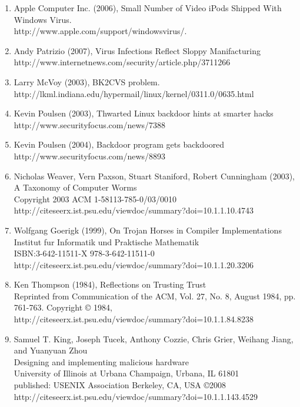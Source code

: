 \documentclass[a4paper, 12pt]{article}
\begin{document}
\begin{enumerate}

\item{Apple Computer Inc. (2006), Small Number of Video iPods Shipped With Windows Virus. \\http://www.apple.com/support/windowsvirus/.}
\item{Andy Patrizio (2007), Virus Infections Reflect Sloppy Manifacturing\\ http://www.internetnews.com/security/article.php/3711266}
\item{Larry McVoy (2003), BK2CVS problem.\\http://lkml.indiana.edu/hypermail/linux/kernel/0311.0/0635.html}
\item{Kevin Poulsen (2003), Thwarted Linux backdoor hints at smarter hacks\\http://www.securityfocus.com/news/7388}
\item{Kevin Poulsen (2004), Backdoor program gets backdoored\\http://www.securityfocus.com/news/8893}
\item{Nicholas Weaver, Vern Paxson, Stuart Staniford, Robert Cunningham (2003), A Taxonomy of Computer Worms\\Copyright 2003 ACM 1-58113-785-0/03/0010\\http://citeseerx.ist.psu.edu/viewdoc/summary?doi=10.1.1.10.4743}
\item{Wolfgang Goerigk (1999), On Trojan Horses in Compiler Implementations\\Institut fur Informatik und Praktische Mathematik\\ISBN:3-642-11511-X 978-3-642-11511-0\\http://citeseerx.ist.psu.edu/viewdoc/summary?doi=10.1.1.20.3206}
\item{Ken Thompson (1984), Reflections on Trusting Trust\\Reprinted from Communication of the ACM, Vol. 27, No. 8, August 1984, pp. 761-763. Copyright © 1984,\\http://citeseerx.ist.psu.edu/viewdoc/summary?doi=10.1.1.84.8238}
\item{Samuel T. King, Joseph Tucek, Anthony Cozzie, Chris Grier, Weihang Jiang, and Yuanyuan Zhou\\Designing and implementing malicious hardware\\University of Illinois at Urbana Champaign, Urbana, IL 61801\\published: USENIX Association Berkeley, CA, USA ©2008\\http://citeseerx.ist.psu.edu/viewdoc/summary?doi=10.1.1.143.4529}

\end{enumerate}
\end{document}
